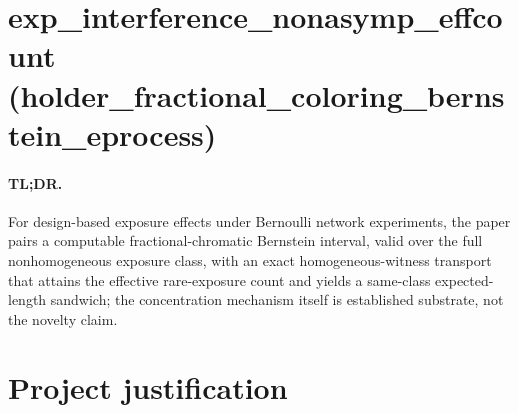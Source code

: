 \documentclass{article}
\begin{document}
\section*{exp\_interference\_nonasymp\_effcount (holder\_fractional\_coloring\_bernstein\_eprocess)}

\paragraph{TL;DR.} For design-based exposure effects under Bernoulli network experiments, the paper pairs a computable fractional-chromatic Bernstein interval, valid over the full nonhomogeneous exposure class, with an exact homogeneous-witness transport that attains the effective rare-exposure count and yields a same-class expected-length sandwich; the concentration mechanism itself is established substrate, not the novelty claim.

\section{Project justification}
\end{document}
